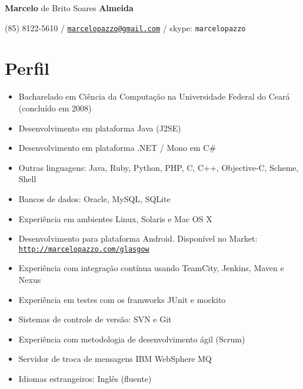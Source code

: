 \documentclass[11pt]{article}
\def\name{\textbf{Marcelo} de Brito Soares \textbf{Almeida}}
\begin{document}
\begin{flushright}

{\huge \name}


\vspace{0.05in}
(85) 8122-5610 / \href{mailto:marcelopazzo@gmail.com}{\tt marcelopazzo@gmail.com} / skype: \tt marcelopazzo

\end{flushright}

\section*{Perfil}
\begin{itemize}
  \item Bacharelado em Ciência da Computação na Universidade Federal do Ceará (concluído em 2008)
  \item Desenvolvimento em plataforma Java (J2SE)
  \item Desenvolvimento em plataforma .NET / Mono em C\#
  \item Outras linguagens: Java, Ruby, Python, PHP, C, C++, Objective-C, Scheme, Shell
  \item Bancos de dados: Oracle, MySQL, SQLite
  \item Experiência em ambientes Linux, Solaris e Mac OS X
  \item Desenvolvimento para plataforma Android. Disponível no Market:
            \href{http://marcelopazzo.com/glasgow}{\tt http://marcelopazzo.com/glasgow}
  \item Experiência com integração contínua usando TeamCity, Jenkins, Maven e Nexus
  \item Experiência em testes com os framworks JUnit e mockito
  \item Sistemas de controle de versão: SVN e Git
  \item Experiência com metodologia de desenvolvimento ágil (Scrum)
  \item Servidor de troca de mensagens IBM WebSphere MQ
  \item Idiomas estrangeiros: Inglês (fluente)
\end{itemize}
\end{document}
